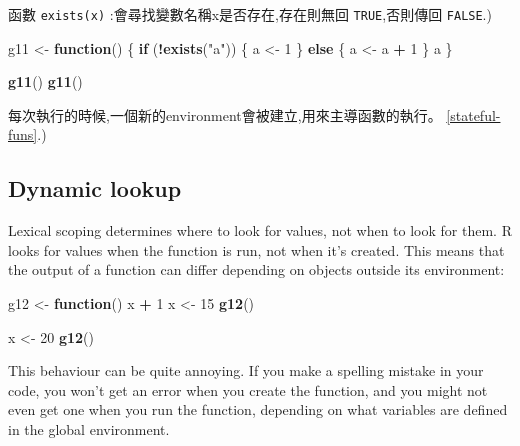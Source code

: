 \documentclass[]{book}
\newenvironment{Shaded}{\begin{snugshade}}{\end{snugshade}}
\newcommand{\ControlFlowTok}[1]{\textcolor[rgb]{0.13,0.29,0.53}{\textbf{#1}}}
\newcommand{\DecValTok}[1]{\textcolor[rgb]{0.00,0.00,0.81}{#1}}
\newcommand{\KeywordTok}[1]{\textcolor[rgb]{0.13,0.29,0.53}{\textbf{#1}}}
\newcommand{\NormalTok}[1]{#1}
\newcommand{\OperatorTok}[1]{\textcolor[rgb]{0.81,0.36,0.00}{\textbf{#1}}}
\newcommand{\StringTok}[1]{\textcolor[rgb]{0.31,0.60,0.02}{#1}}
\theoremstyle{definition}
\theoremstyle{definition}
\theoremstyle{definition}
\theoremstyle{remark}
\begin{document}
函數 \texttt{exists(x)} :會尋找變數名稱x是否存在,存在則無回
\texttt{TRUE},否則傳回 \texttt{FALSE}.)

\begin{Shaded}
\begin{Highlighting}[]
\NormalTok{g11 <-}\StringTok{ }\ControlFlowTok{function}\NormalTok{() \{}
  \ControlFlowTok{if}\NormalTok{ (}\OperatorTok{!}\KeywordTok{exists}\NormalTok{(}\StringTok{"a"}\NormalTok{)) \{}
\NormalTok{    a <-}\StringTok{ }\DecValTok{1}
\NormalTok{  \} }\ControlFlowTok{else}\NormalTok{ \{}
\NormalTok{    a <-}\StringTok{ }\NormalTok{a }\OperatorTok{+}\StringTok{ }\DecValTok{1}
\NormalTok{  \}}
\NormalTok{  a}
\NormalTok{\}}

\KeywordTok{g11}\NormalTok{()}
\KeywordTok{g11}\NormalTok{()}
\end{Highlighting}
\end{Shaded}

每次執行的時候,一個新的environment會被建立,用來主導函數的執行。
\ref{stateful-funs}.)

\hypertarget{dynamic-lookup}{%
\subsection{Dynamic lookup}\label{dynamic-lookup}}

Lexical scoping determines where to look for values, not when to look
for them. R looks for values when the function is run, not when it's
created. This means that the output of a function can differ depending
on objects outside its environment:

\begin{Shaded}
\begin{Highlighting}[]
\NormalTok{g12 <-}\StringTok{ }\ControlFlowTok{function}\NormalTok{() x }\OperatorTok{+}\StringTok{ }\DecValTok{1}
\NormalTok{x <-}\StringTok{ }\DecValTok{15}
\KeywordTok{g12}\NormalTok{()}
\end{Highlighting}
\end{Shaded}

\begin{Shaded}
\begin{Highlighting}[]
\NormalTok{x <-}\StringTok{ }\DecValTok{20}
\KeywordTok{g12}\NormalTok{()}
\end{Highlighting}
\end{Shaded}

This behaviour can be quite annoying. If you make a spelling mistake in
your code, you won't get an error when you create the function, and you
might not even get one when you run the function, depending on what
variables are defined in the global environment.
\end{document}
